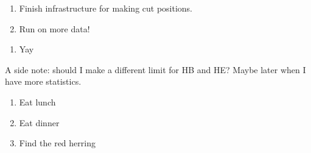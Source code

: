 

\begin{enumerate}
\item Finish infrastructure for making cut positions.
\item Run on more data!
\end{enumerate}


\begin{enumerate}
\item Yay
\end{enumerate}


A side note: should I make a different limit for HB and HE?  Maybe later when I have more statistics.






\begin{enumerate}
\item Eat lunch
\item Eat dinner
\item Find the red herring
\end{enumerate}


